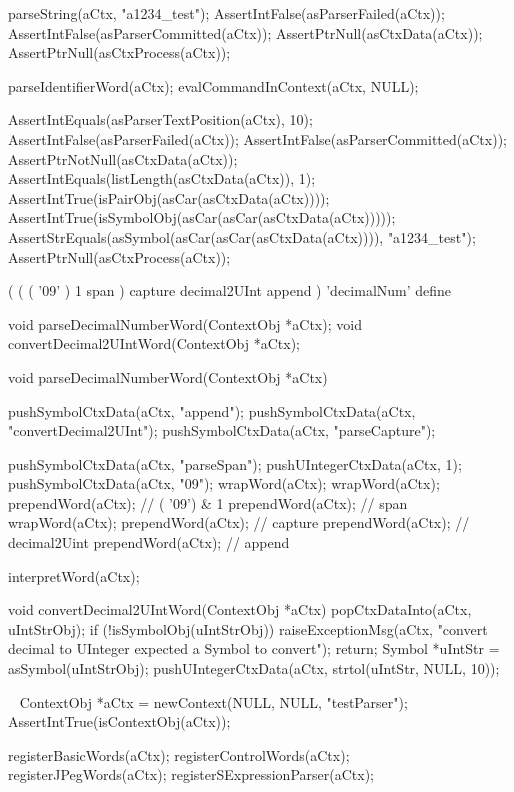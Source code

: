 \startCTest
  parseString(aCtx, "a1234_test");
  AssertIntFalse(asParserFailed(aCtx));
  AssertIntFalse(asParserCommitted(aCtx));
  AssertPtrNull(asCtxData(aCtx));
  AssertPtrNull(asCtxProcess(aCtx));
  
  parseIdentifierWord(aCtx);
  evalCommandInContext(aCtx, NULL);
  
  AssertIntEquals(asParserTextPosition(aCtx), 10);
  AssertIntFalse(asParserFailed(aCtx));
  AssertIntFalse(asParserCommitted(aCtx));
  AssertPtrNotNull(asCtxData(aCtx));
  AssertIntEquals(listLength(asCtxData(aCtx)), 1);
  AssertIntTrue(isPairObj(asCar(asCtxData(aCtx))));
  AssertIntTrue(isSymbolObj(asCar(asCar(asCtxData(aCtx)))));
  AssertStrEquals(asSymbol(asCar(asCar(asCtxData(aCtx)))), "a1234_test");
  AssertPtrNull(asCtxProcess(aCtx));
\stopCTest
\stopTestCase
\stopTestSuite

\startTestSuite[parseDecimalNumberWord]

\starttyping
(
  (
    ( '09' ) 1 span
  ) capture decimal2UInt append
) 'decimalNum' define
\stoptyping

\startCHeader
void parseDecimalNumberWord(ContextObj *aCtx);
void convertDecimal2UIntWord(ContextObj *aCtx);
\stopCHeader

\startCCode
void parseDecimalNumberWord(ContextObj *aCtx) {

  pushSymbolCtxData(aCtx, "append");
  pushSymbolCtxData(aCtx, "convertDecimal2UInt");
  pushSymbolCtxData(aCtx, "parseCapture");
  
  pushSymbolCtxData(aCtx, "parseSpan");
  pushUIntegerCtxData(aCtx, 1);
  pushSymbolCtxData(aCtx, "09");
  wrapWord(aCtx);
  wrapWord(aCtx);
  prependWord(aCtx); // ( '09') & 1
  prependWord(aCtx); // span
  wrapWord(aCtx);
  prependWord(aCtx); // capture
  prependWord(aCtx); // decimal2Uint
  prependWord(aCtx); // append
  
  interpretWord(aCtx);
}

void convertDecimal2UIntWord(ContextObj *aCtx) {
  popCtxDataInto(aCtx, uIntStrObj);
  if (!isSymbolObj(uIntStrObj)) {
    raiseExceptionMsg(aCtx,
      "convert decimal to UInteger expected a Symbol to convert");
    return;
  }
  Symbol *uIntStr = asSymbol(uIntStrObj);  
  pushUIntegerCtxData(aCtx, strtol(uIntStr, NULL, 10));
}
\stopCCode

\CTestsSuiteSetup\
\startCTest
  ContextObj *aCtx = newContext(NULL, NULL, "testParser");
  AssertIntTrue(isContextObj(aCtx));
  
  registerBasicWords(aCtx);
  registerControlWords(aCtx);
  registerJPegWords(aCtx);
  registerSExpressionParser(aCtx);
\stopCTest

